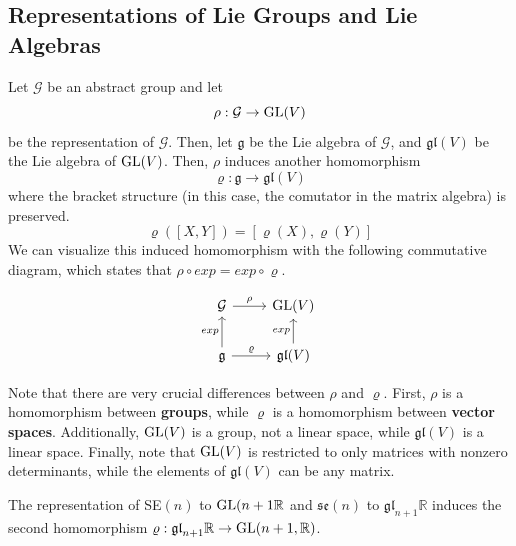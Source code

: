\subsection{Representations of Lie Groups and Lie Algebras}

  Let $\mathcal{G}$ be an abstract group and let
  \begin{equation}
    \rho: \mathcal{G} \rightarrow \operatorname{GL}(V)
  \end{equation}
  be the representation of $\mathcal{G}$. Then, let $\mathfrak{g}$ be the Lie algebra of $\mathcal{G}$, and $\mathfrak{gl}(V)$ be the Lie algebra of $\operatorname{GL}(V)$. Then, $\rho$ induces another homomorphism 
  \begin{equation}
    \varrho: \mathfrak{g} \rightarrow \mathfrak{gl}(V)
  \end{equation}
  where the bracket structure (in this case, the comutator in the matrix algebra) is preserved. 
  \begin{equation}
    \varrho([X,Y]) = [\varrho(X), \varrho(Y)]
  \end{equation}
  We can visualize this induced homomorphism with the following commutative diagram, which states that $\rho \circ exp = exp \circ \varrho$. 

  \[\begin{tikzcd}
  \mathcal{G} \arrow{r}{\rho} & \GL(V)\\
  \mathfrak{g} \arrow{u}{exp} \arrow{r}{\varrho} & \mathfrak{gl}(V) \arrow{u}{exp}
  \end{tikzcd}\]

  Note that there are very crucial differences between $\rho$ and $\varrho$. First, $\rho$ is a homomorphism between \textbf{groups}, while $\varrho$ is a homomorphism between \textbf{vector spaces}. Additionally, $\operatorname{GL}(V)$ is a group, not a linear space, while $\mathfrak{gl}(V)$ is a linear space. Finally, note that $\operatorname{GL}(V)$ is restricted to only matrices with nonzero determinants, while the elements of $\mathfrak{gl}(V)$ can be any matrix. 

  \begin{example}
    The representation of SE$(n)$ to $\operatorname{GL}(n+1 \mathbb{R}$ and $\mathfrak{se}(n)$ to $\mathfrak{gl}_{n+1} \mathbb{R}$ induces the second homomorphism $\varrho: \mathfrak{gl}_{n+1} \mathbb{R} \rightarrow \operatorname{GL}(n+1, \mathbb{R})$. 
  \end{example}

